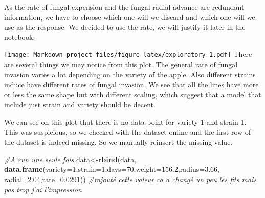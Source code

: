 \documentclass[
]{article}
\newenvironment{Shaded}{\begin{snugshade}}{\end{snugshade}}
\newcommand{\CommentTok}[1]{\textcolor[rgb]{0.56,0.35,0.01}{\textit{#1}}}
\newcommand{\DataTypeTok}[1]{\textcolor[rgb]{0.13,0.29,0.53}{#1}}
\newcommand{\DecValTok}[1]{\textcolor[rgb]{0.00,0.00,0.81}{#1}}
\newcommand{\FloatTok}[1]{\textcolor[rgb]{0.00,0.00,0.81}{#1}}
\newcommand{\KeywordTok}[1]{\textcolor[rgb]{0.13,0.29,0.53}{\textbf{#1}}}
\newcommand{\NormalTok}[1]{#1}
\newcommand{\OperatorTok}[1]{\textcolor[rgb]{0.81,0.36,0.00}{\textbf{#1}}}
\newcommand{\StringTok}[1]{\textcolor[rgb]{0.31,0.60,0.02}{#1}}
\begin{document}
As the rate of fungal expension and the fungal radial advance are
redundant information, we have to choose which one will we discard and
which one will we use as the response. We decided to use the rate, we
will justify it later in the notebook.

\begin{Shaded}
\end{Shaded}

\texttt{[image: Markdown\_project\_files/figure-latex/exploratory-1.pdf]}
There are several things we may notice from this plot. The general rate
of fungal invasion varies a lot depending on the variety of the apple.
Also different strains induce have different rates of fungal invasion.
We see that all the lines have more or less the same shape but with
different scaling, which suggest that a model that include just strain
and variety should be decent.

We can see on this plot that there is no data point for variety 1 and
strain 1. This was suspicious, so we checked with the dataset online and
the first row of the dataset is indeed missing. So we manually reinsert
the missing value.

\begin{Shaded}
\begin{Highlighting}[]
\CommentTok{#A run une seule fois}
\NormalTok{data<-}\KeywordTok{rbind}\NormalTok{(data, }\KeywordTok{data.frame}\NormalTok{(}\DataTypeTok{variety=}\DecValTok{1}\NormalTok{,}\DataTypeTok{strain=}\DecValTok{1}\NormalTok{,}\DataTypeTok{days=}\DecValTok{70}\NormalTok{,}\DataTypeTok{weight=}\FloatTok{156.2}\NormalTok{,}\DataTypeTok{radius=}\FloatTok{3.66}\NormalTok{,}
                             \DataTypeTok{radial=}\FloatTok{2.04}\NormalTok{,}\DataTypeTok{rate=}\FloatTok{0.0291}\NormalTok{))}
\CommentTok{#rajouté cette valeur ca a changé un peu les fits mais pas trop j'ai l'impression}
\end{Highlighting}
\end{Shaded}
\end{document}
